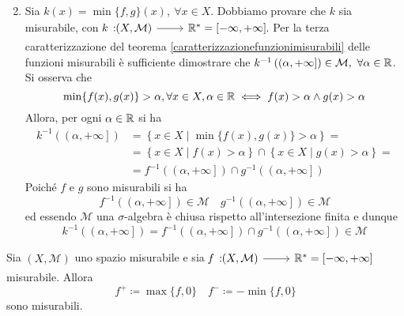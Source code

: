 \begin{demonstration}
\begin{enumerate}
\begin{equation*}
	\end{equation*}
		\item Sia $ k(x)=\min\{f,g\}(x),\ \forall x\in X$. Dobbiamo provare che $k$ sia misurabile, con $\funz{k}{\left(X,\mathcal{M}\right)}{\realset^{\ast}=\left[-\infty,+\infty\right]}$. Per la terza caratterizzazione del teorema \ref{caratterizzazionefunzionimisurabili} delle funzioni misurabili è sufficiente dimostrare che $k^{-1}\left(\left(\alpha,+\infty\right]\right)\in\mathcal{M},\ \forall\alpha\in\realset$.
		Si osserva che
		\begin{equation*}
			\min\{f(x),g(x)\}>\alpha, \forall x\in X, \alpha\in\mathbb{R}\iff f(x)>\alpha \wedge g(x)> \alpha
		\end{equation*}
		Allora, per ogni $\alpha\in\mathbb{R}$ si ha
		\begin{align*}
			k^{-1}\left(\left(\alpha,+\infty\right]\right)&=\left\{x\in X\mid \min\{f(x),g(x)\}>\alpha\right\}=\\
			&=\left\{x\in X\mid f(x)> \alpha\right\}\cap\left\{x\in X\mid g(x)>\alpha\right\}=\\
			&=f^{-1}\left(\left(\alpha,+\infty\right]\right)\cap g^{-1}\left(\left(\alpha,+\infty\right]\right)
		\end{align*}
		Poiché $f$ e $g$ sono misurabili si ha
		\begin{equation*}
			f^{-1}\left(\left(\alpha,+\infty\right]\right)\in\mathcal{M}\quad g^{-1}\left(\left(\alpha,+\infty\right]\right)\in\mathcal{M}
		\end{equation*}
		ed essendo $\mathcal{M}$ una $\sigma$-algebra è chiusa rispetto all'intersezione finita e dunque
		\begin{equation*}
			k^{-1}\left(\left(\alpha,+\infty\right]\right)=f^{-1}\left(\left(\alpha,+\infty\right]\right)\cap g^{-1}\left(\left(\alpha,+\infty\right]\right)\in\mathcal{M}
		\end{equation*}
	\end{enumerate}
\end{demonstration}
\begin{corollary}
	Sia $ \left(X,\mathcal{M}\right)$ uno spazio misurabile e sia $\funz{f}{\left(X,\mathcal{M}\right)}{\realset^{\ast}=\left[-\infty,+\infty\right]}$ misurabile.
	Allora
	\begin{equation*}
		f^{+}\coloneqq \max\{f,0\}\quad f^{-}\coloneqq-\min\{f,0\}
	\end{equation*}
	sono misurabili.
\end{corollary}
